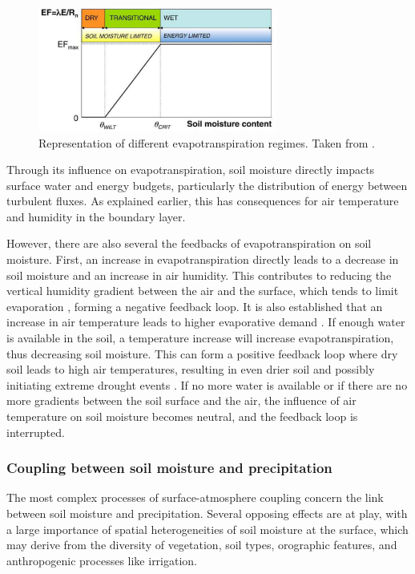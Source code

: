\begin{figure}[ht]
    \centering
    \includegraphics[width=0.7\textwidth]{images/intro/evap_regimes.png}
    \caption{Representation of different evapotranspiration regimes. Taken from \citet{seneviratne_investigating_2010}.}
    \label{fig:evap_regimes}
\end{figure}

Through its influence on evapotranspiration, soil moisture directly impacts surface water and energy budgets, particularly the distribution of energy between turbulent fluxes. As explained earlier, this has consequences for air temperature and humidity in the boundary layer.

However, there are also several the feedbacks of evapotranspiration on soil moisture. First, an increase in evapotranspiration directly leads to a decrease in soil moisture and an increase in air humidity. This contributes to reducing the vertical humidity gradient between the air and the surface, which tends to limit evaporation \citep{allen_crop_2000}, forming a negative feedback loop. It is also established that an increase in air temperature leads to higher evaporative demand \citep{jarvis_stomatal_1986}. If enough water is available in the soil, a temperature increase will increase evapotranspiration, thus decreasing soil moisture. This can form a positive feedback loop where dry soil leads to high air temperatures, resulting in even drier soil and possibly initiating extreme drought events \citep{quesada_asymmetric_2012}. If no more water is available or if there are no more gradients between the soil surface and the air, the influence of air temperature on soil moisture becomes neutral, and the feedback loop is interrupted.

\subsubsection*{Coupling between soil moisture and precipitation}

The most complex processes of surface-atmosphere coupling concern the link between soil moisture and precipitation. Several opposing effects are at play, with a large importance of spatial heterogeneities of soil moisture at the surface, which may derive from the diversity of vegetation, soil types, orographic features, and anthropogenic processes like irrigation.

